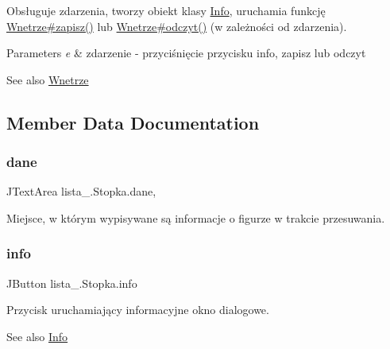 Obsługuje zdarzenia, tworzy obiekt klasy \mbox{\hyperlink{classlista__5_1_1_info}{Info}}, uruchamia funkcję \mbox{\hyperlink{classlista__5_1_1_wnetrze_a3f2f50d048d7c41f2cbbb7f91f59c077}{Wnetrze\#zapisz()}} lub \mbox{\hyperlink{classlista__5_1_1_wnetrze_ad5ebd5c04f2c4b9de6954303c96a5856}{Wnetrze\#odczyt()}} (w zależności od zdarzenia). 
\begin{DoxyParams}{Parameters}
{\em e} & zdarzenie -\/ przyciśnięcie przycisku info, zapisz lub odczyt \\
\hline
\end{DoxyParams}
\begin{DoxySeeAlso}{See also}
\mbox{\hyperlink{classlista__5_1_1_wnetrze}{Wnetrze}} 
\end{DoxySeeAlso}


\subsection{Member Data Documentation}
\mbox{\label{classlista__5_1_1_stopka_a8e8ef21758defd5b137e609b00d2f59e}} 
\subsubsection{\texorpdfstring{dane}{dane}}
{\footnotesize\ttfamily J\+Text\+Area lista\+\_.\+Stopka.\+dane\hspace{0.3cm}{\ttfamily [static]}, {\ttfamily [package]}}

Miejsce, w którym wypisywane są informacje o figurze w trakcie przesuwania. \mbox{\label{classlista__5_1_1_stopka_a77dc029a3ed5c0ea4d49b1279a01b1bc}} 
\subsubsection{\texorpdfstring{info}{info}}
{\footnotesize\ttfamily J\+Button lista\+\_.\+Stopka.\+info\hspace{0.3cm}{\ttfamily [private]}}

Przycisk uruchamiający informacyjne okno dialogowe. \begin{DoxySeeAlso}{See also}
\mbox{\hyperlink{classlista__5_1_1_info}{Info}} 
\end{DoxySeeAlso}
\mbox{\label{classlista__5_1_1_stopka_a658e033afcd318e8f01051b5ff0caa0b}} 
